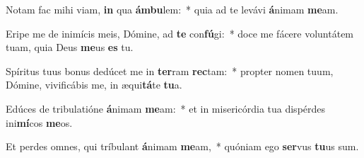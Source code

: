 \item Notam fac mihi viam, \textbf{in} qua \textbf{ám}\textbf{bu}lem:~* quia ad te levávi \textbf{á}nimam \textbf{me}am.
\item Eripe me de inimícis meis, Dómine, ad \textbf{te} con\textbf{fú}gi:~* doce me fácere voluntátem tuam, quia Deus \textbf{me}us \textbf{es} tu.
\item Spíritus tuus bonus dedúcet me in \textbf{ter}ram \textbf{rec}tam:~* propter nomen tuum, Dómine, vivificábis me, in æqui\textbf{tá}te \textbf{tu}a.
\item Edúces de tribulatióne \textbf{á}nimam \textbf{me}am:~* et in misericórdia tua dispérdes ini\textbf{mí}cos \textbf{me}os.
\item Et perdes omnes, qui tríbulant \textbf{á}nimam \textbf{me}am,~* quóniam ego \textbf{ser}vus \textbf{tu}us sum.
